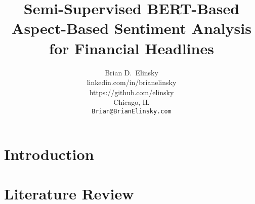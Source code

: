 \documentclass[11pt,a4paper,titlepage]{article}
\title{Semi-Supervised BERT-Based Aspect-Based Sentiment Analysis for Financial Headlines}
\author{%
    Brian D.~Elinsky \\
    linkedin.com/in/brianelinsky\\
    https://github.com/elinsky\\
    Chicago, IL \\
    \texttt{Brian@BrianElinsky.com}
}
\begin{document}
    \maketitle















    \begin{abstract}
        
    \end{abstract}


    \section{Introduction}\label{sec:introduction}
    


    \section{Literature Review}\label{sec:literature-review}
    
\end{document}
